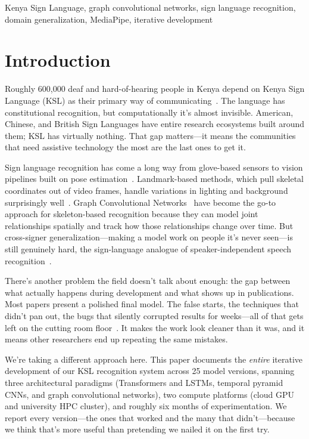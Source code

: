 \documentclass[conference]{IEEEtran}
\begin{document}
\begin{IEEEkeywords}
Kenya Sign Language, graph convolutional networks, sign language recognition, domain generalization, MediaPipe, iterative development
\end{IEEEkeywords}

\section{Introduction}

Roughly 600,000 deaf and hard-of-hearing people in Kenya depend on Kenya Sign Language (KSL) as their primary way of communicating~\cite{ai4ksl2024}. The language has constitutional recognition, but computationally it's almost invisible. American, Chinese, and British Sign Languages have entire research ecosystems built around them; KSL has virtually nothing. That gap matters---it means the communities that need assistive technology the most are the last ones to get it.

Sign language recognition has come a long way from glove-based sensors to vision pipelines built on pose estimation~\cite{robert2023review}. Landmark-based methods, which pull skeletal coordinates out of video frames, handle variations in lighting and background surprisingly well~\cite{aiman2023}. Graph Convolutional Networks~\cite{yan2018stgcn} have become the go-to approach for skeleton-based recognition because they can model joint relationships spatially and track how those relationships change over time. But cross-signer generalization---making a model work on people it's never seen---is still genuinely hard, the sign-language analogue of speaker-independent speech recognition~\cite{pu2024signer, desmond2024}.

There's another problem the field doesn't talk about enough: the gap between what actually happens during development and what shows up in publications. Most papers present a polished final model. The false starts, the techniques that didn't pan out, the bugs that silently corrupted results for weeks---all of that gets left on the cutting room floor~\cite{lipton2019, dodge2019}. It makes the work look cleaner than it was, and it means other researchers end up repeating the same mistakes.

We're taking a different approach here. This paper documents the \textit{entire} iterative development of our KSL recognition system across 25 model versions, spanning three architectural paradigms (Transformers and LSTMs, temporal pyramid CNNs, and graph convolutional networks), two compute platforms (cloud GPU and university HPC cluster), and roughly six months of experimentation. We report every version---the ones that worked and the many that didn't---because we think that's more useful than pretending we nailed it on the first try.
\end{document}
